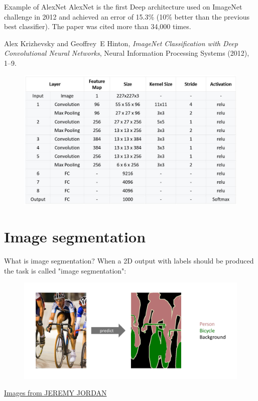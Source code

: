 \documentclass[handout]{beamer}
\begin{document}
\begin{frame}{Example of AlexNet}
    \alert{AlexNet} is the first Deep architecture used on ImageNet challenge in 2012 and achieved an \alert{error of 15.3\%} (10\% better than the previous best classifier). The paper was cited more than 34,000 times.

\begin{thebibliography}{GBC16}

Alex Krizhevsky and Geoffrey~E Hinton, \emph{{ImageNet Classification with Deep
  Convolutional Neural Networks}}, Neural Information Processing Systems
  (2012), 1--9.

\end{thebibliography}
    \begin{figure}
        \centering
        \includegraphics[width=.5\textwidth]{fig/L2/AlexNet_Summary_Table.jpg}

    \end{figure}
\end{frame}

\section{Image segmentation}

\begin{frame}{What is image segmentation?}
    When a 2D output with labels should be produced the task is called "image segmentation":
    \begin{figure}
   \centering
    \includegraphics[width=.8\textwidth]{fig/L2/Screen-Shot-2018-05-17-at-7.42.16-PM.png}
\end{figure}
{\tiny \href{https://www.jeremyjordan.me/semantic-segmentation/}{ Images from JEREMY JORDAN}}
\end{frame}
\end{document}
